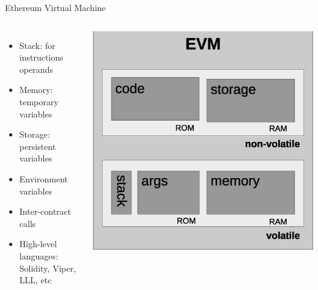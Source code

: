 \documentclass{beamer}
\begin{document}
\begin{frame}{Ethereum Virtual Machine \footnotesize{\cite{wood2014ethereum}}}
	\begin{columns}[c]
		\begin{itemize}
			\item Stack: for instructions operands
			\item Memory: temporary variables
			\item Storage: persistent variables
			\item Environment variables
			\item Inter-contract calls
			\item High-level languages:
			Solidity, Viper, LLL, etc
		\end{itemize}
		\includegraphics[scale=0.3]{Figures/evm.eps}
	\end{columns}
\end{frame}
\end{document}
